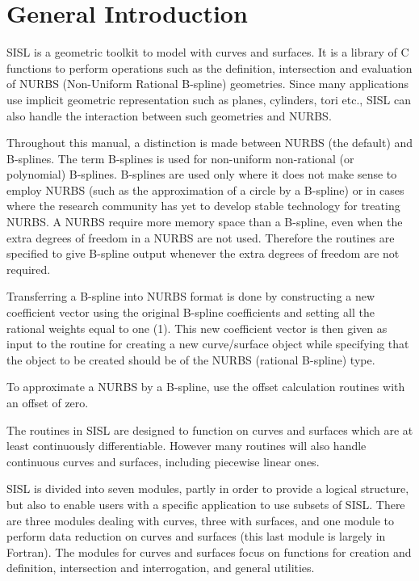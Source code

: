 \chapter{General Introduction}
\label{introduction}
SISL is a geometric toolkit to model with curves and surfaces. It is a
library of C functions to perform operations such as the definition,
intersection and evaluation of NURBS (Non-Uniform Rational B-spline)
geometries. Since many applications use implicit geometric
representation such as planes, cylinders, tori etc., SISL can also
handle the interaction between such geometries and NURBS.

\medskip
Throughout this manual, a distinction is made between NURBS (the
default) and B-splines. The term B-splines is used for non-uniform
non-rational (or polynomial) B-splines. B-splines are used only where it
does not make sense to employ NURBS (such as the approximation of a
circle by a B-spline) or in cases where the research
community has yet to develop stable technology for treating NURBS.
A NURBS require more memory space than a B-spline, even when the
extra degrees of freedom in a NURBS are not used. Therefore the routines
are specified to give B-spline output whenever the extra degrees of
freedom are not required.

Transferring a B-spline into NURBS format is done by constructing a new
coefficient vector using the original B-spline coefficients and setting
all the rational weights equal to one (1).
This new coefficient vector is then given as input to the routine for
creating a new curve/surface object while specifying that the object to
be created should be of the NURBS (rational B-spline) type.

To approximate a NURBS by a B-spline, use the offset calculation
routines with an offset of zero.

The routines in SISL are designed to function on curves and surfaces
which are at least continuously differentiable. However many routines
will also handle continuous curves and surfaces, including piecewise
linear ones.

\medskip
SISL is divided into seven modules, partly in order to provide a logical
structure, but also to enable users with a specific application to use
subsets of SISL. There are three modules dealing with curves, three with
surfaces, and one module to perform data reduction on curves and
surfaces (this last module is largely in Fortran). The modules for
curves and surfaces focus on functions for creation and definition,
intersection and interrogation, and general utilities.

